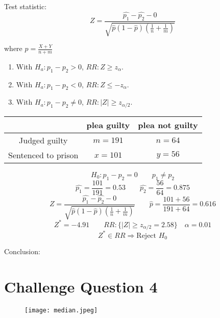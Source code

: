 Test statistic: \[Z=\frac{\hat{p_1}-\hat{p_2}-0}{\sqrt{\hat{p}(1-\hat{p}) \left(\frac{1}{n}+\frac{1}{m} \right)}}\] 

where $\hat{p}=\frac{X+Y}{n+m}$

\begin{enumerate}
\item With $H_a: p_1-p_2>0$, $RR:Z \geq z_{\alpha}$.
\item With $H_a: p_1-p_2<0$, $RR:Z \leq -z_{\alpha}$.
\item With $H_a: p_1-p_2\neq 0$, $RR:|Z|\geq z_{\alpha/2}$.
\end{enumerate}


\begin{exmp}
\begin{tabular}{c|c|c}
\hline
	& plea guilty & plea not guilty \\ \hline
Judged guilty	& $m=191$ & $n=64$ \\ \hline
Sentenced to prison & $x=101$ & $y=56$ \\ \hline
\end{tabular}

\[H_0: p_1-p_2=0 \qquad p_1\neq p_2\]
\[\hat{p_1}=\frac{101}{191}=0.53 \qquad \hat{p_2}=\frac{56}{64}=0.875\]
\[Z=\frac{\hat{p_1}-\hat{p_2}-0}{\sqrt{\hat{p}(1-\hat{p}) \left(\frac{1}{n}+\frac{1}{m} \right)}} \qquad \hat{p}=\frac{101+56}{191+64}=0.616\] 
\[Z^*=-4.91 \qquad RR:\{|Z|\geq z_{\alpha/2}=2.58\} \quad \alpha=0.01\]
\[Z^* \in RR \Rightarrow \text{Reject }H_0\]

Conclusion:
\end{exmp}

\section{Challenge Question 4}
\begin{figure}[H]
\centering
\texttt{[image: median.jpeg]}
\end{figure}

